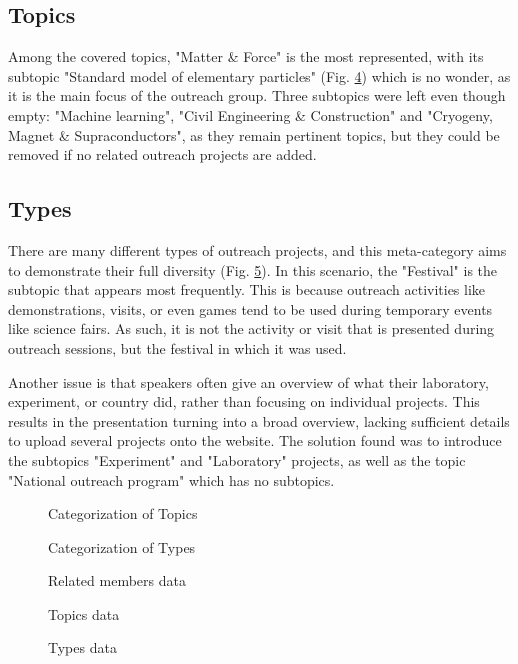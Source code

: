 \subsection*{Topics}
Among the covered topics, "Matter \& Force" is the most represented, with its subtopic "Standard model of elementary particles" (Fig. \ref{fig:topics}) which is no wonder, as it is the main focus of the outreach group. Three subtopics were left even though empty: "Machine learning", "Civil Engineering \& Construction" and "Cryogeny, Magnet \& Supraconductors", as they remain pertinent topics, but they could be removed if no related outreach projects are added.  

\subsection*{Types}
There are many different types of outreach projects, and this meta-category aims to demonstrate their full diversity (Fig. \ref{fig:types}). In this scenario, the "Festival" is the subtopic that appears most frequently. This is because outreach activities like demonstrations, visits, or even games tend to be used during temporary events like science fairs. As such, it is not the activity or visit that is presented during outreach sessions, but the festival in which it was used. 

Another issue is that speakers often give an overview of what their laboratory, experiment, or country did, rather than focusing on individual projects. This results in the presentation turning into a broad overview, lacking sufficient details to upload several projects onto the website. The solution found was to introduce the subtopics "Experiment" and "Laboratory" projects, as well as the topic "National outreach program" which has no subtopics.

\begin{figure}[p]
    \centering
    
    \caption{Categorization of Topics}
    \label{fig:Topics_category}
\end{figure}


\begin{figure}[p]
    \centering
    
    \caption{Categorization of Types}
    \label{fig:Types_category}
\end{figure}

\begin{figure}
    \centering
    
    \caption{Related members data}
    \label{fig:members}
\end{figure}

\begin{figure}
    \centering
    
    \caption{Topics data}
    \label{fig:topics}
\end{figure}

\begin{figure}
    \centering
    
    \caption{Types data}
    \label{fig:types}
\end{figure}